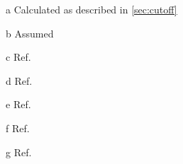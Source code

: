 \begin{table}[!htbp]
\begin{threeparttable}

        \medskip
        \vspace{-2.6229525pt}
        \begin{tablenotes}
            \begin{scriptsize}
            \item[a] Calculated as described in \cref{sec:cutoff}
            \item[b] Assumed
            \item[c] Ref.~\cite{SAECharging2011}
            \item[d] Ref.~\cite{Kizilel2009, Lu2013}
            \item[e] Ref.~\cite{GMBoltBatteryDims}
		    \item[f] Ref.~\cite{Groger2015}
            \item[g] Ref.~\cite{Svens2013}
            \end{scriptsize}
            \vspace{1ex}

\end{tablenotes}
\end{threeparttable}
\end{table}
